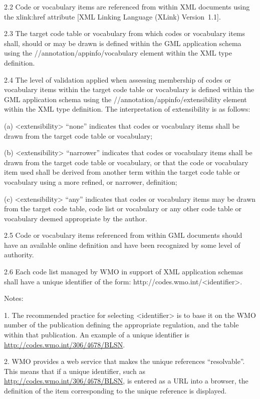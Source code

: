 2.2 Code or vocabulary items are referenced from within XML documents using the xlink:href attribute {[}XML Linking Language (XLink) Version~1.1{]}.

2.3 The target code table or vocabulary from which codes or vocabulary items shall, should or may be drawn is defined within the GML application schema using the //annotation/appinfo/vocabulary element within the XML type definition.

2.4 The level of validation applied when assessing membership of codes or vocabulary items within the target code table or vocabulary is defined within the GML application schema using the //annotation/appinfo/extensibility element within the XML type definition. The interpretation of extensibility is as follows:

(a) \textless extensibility\textgreater{} ``none'' indicates that codes or vocabulary items shall be drawn from the target code table or vocabulary;

(b) \textless extensibility\textgreater{} ``narrower'' indicates that codes or vocabulary items shall be drawn from the target code table or vocabulary, or that the code or vocabulary item used shall be derived from another term within the target code table or vocabulary using a more refined, or narrower, definition;

(c) \textless extensibility\textgreater{} ``any'' indicates that codes or vocabulary items may be drawn from the target code table, code list or vocabulary or any other code table or vocabulary deemed appropriate by the author.

2.5 Code or vocabulary items referenced from within GML documents should have an available online definition and have been recognized by some level of authority.

2.6 Each code list managed by WMO in support of XML application schemas shall have a unique identifier of the form: http://codes.wmo.int/\textless identifier\textgreater.

Notes:

1. The recommended practice for selecting \textless identifier\textgreater{} is to base it on the WMO number of the publication defining the appropriate regulation, and the table within that publication. An example of a unique identifier is \url{http://codes.wmo.int/306/4678/BLSN}.

2. WMO provides a web service that makes the unique references ``resolvable''. This means that if a unique identifier, such as \url{http://codes.wmo.int/306/4678/BLSN}, is entered as a URL into a browser, the definition of the item corresponding to the unique reference is displayed.

